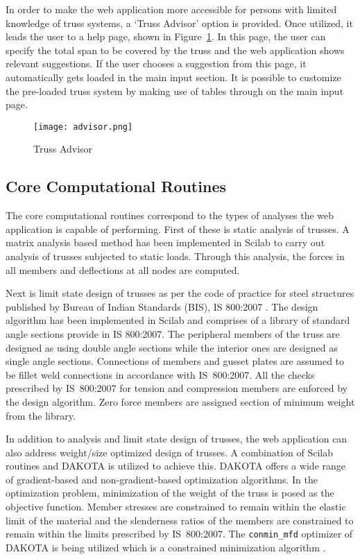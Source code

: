 \documentclass[preprint]{elsarticle}
\begin{document}
In order to make the web application more accessible for persons with limited
knowledge of truss systems, a `Truss Advisor' option is provided. Once utilized,
it leads the user to a help page, shown in Figure~\ref{fig:advisor}. In this page,
the user can specify the total span to be covered by the truss and the web
application shows relevant suggestions. If the user chooses a suggestion from
this page, it automatically gets loaded in the main input section. It is
possible to customize the pre-loaded truss system by making use of tables 
through  on the main input page.


\begin{figure}
\centering
\texttt{[image: advisor.png]}
\caption{Truss Advisor}
\label{fig:advisor}
\end{figure}


\subsection{Core Computational Routines}
The core computational routines correspond to the types of analyses the web
application is capable of performing. First of these is static analysis of
trusses. A matrix analysis based method has been implemented in Scilab to carry
out analysis of trusses subjected to static loads. Through this analysis, the
forces in all members and deflections at all nodes are computed.

Next is limit state design of trusses as per the code of practice for steel
structures published by Bureau of Indian Standards (BIS), IS 800:2007
\cite{IS800}. The design algorithm has been implemented in Scilab and comprises
of a library of  standard angle sections provide in IS 800:2007. The
peripheral members of the truss are designed as using double angle sections while
the interior ones are designed as single angle sections. Connections of members
and gusset plates are assumed to be  fillet weld connections
in accordance with IS~800:2007. All the checks prescribed by
IS~800:2007 for tension and compression members are enforced by the design
algorithm. Zero force members are assigned section of minimum weight from the
library.

In addition to analysis and limit state design of trusses, the web application
can also address weight/size optimized design of trusses. A
combination of Scilab routines and DAKOTA is utilized to achieve this. DAKOTA
offers a wide range of gradient-based and non-gradient-based optimization
algorithms. In the optimization problem, minimization of the weight of the truss
is posed as the objective function. Member stresses are constrained to remain
within the elastic limit of the material and the slenderness ratios of the members are 
constrained to remain within the limits prescribed by IS~800:2007. The 
\texttt{conmin\_mfd} optimizer of DAKOTA is being utilized which is a constrained 
minimization algorithm \cite{Vanderplaats1973}.
\end{document}
